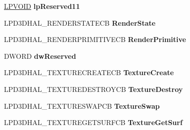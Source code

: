\begin{DoxyCompactItemize}
\mbox{\label{struct___d3_d_h_a_l___c_a_l_l_b_a_c_k_s_ae641db5139f703c8121cf2cdafe77bea}} 
\hyperlink{interfacevoid}{L\+P\+V\+O\+ID} {\bfseries lp\+Reserved11}
\item 
\mbox{\label{struct___d3_d_h_a_l___c_a_l_l_b_a_c_k_s_a1f3d6ab6e90412c0942079c0cc2cc297}} 
L\+P\+D3\+D\+H\+A\+L\+\_\+\+R\+E\+N\+D\+E\+R\+S\+T\+A\+T\+E\+CB {\bfseries Render\+State}
\item 
\mbox{\label{struct___d3_d_h_a_l___c_a_l_l_b_a_c_k_s_a1d99b52b0e480cd1afcd4b77173895ca}} 
L\+P\+D3\+D\+H\+A\+L\+\_\+\+R\+E\+N\+D\+E\+R\+P\+R\+I\+M\+I\+T\+I\+V\+E\+CB {\bfseries Render\+Primitive}
\item 
\mbox{\label{struct___d3_d_h_a_l___c_a_l_l_b_a_c_k_s_ac62b7b42341c7be361a82766ef412054}} 
D\+W\+O\+RD {\bfseries dw\+Reserved}
\item 
\mbox{\label{struct___d3_d_h_a_l___c_a_l_l_b_a_c_k_s_af08d0797cb0e285fb07c2abb7fdbc12d}} 
L\+P\+D3\+D\+H\+A\+L\+\_\+\+T\+E\+X\+T\+U\+R\+E\+C\+R\+E\+A\+T\+E\+CB {\bfseries Texture\+Create}
\item 
\mbox{\label{struct___d3_d_h_a_l___c_a_l_l_b_a_c_k_s_af7dccd66865eab6f9fb19172624d206d}} 
L\+P\+D3\+D\+H\+A\+L\+\_\+\+T\+E\+X\+T\+U\+R\+E\+D\+E\+S\+T\+R\+O\+Y\+CB {\bfseries Texture\+Destroy}
\item 
\mbox{\label{struct___d3_d_h_a_l___c_a_l_l_b_a_c_k_s_ac5a7ea06127d3d693a1d3b035984968f}} 
L\+P\+D3\+D\+H\+A\+L\+\_\+\+T\+E\+X\+T\+U\+R\+E\+S\+W\+A\+P\+CB {\bfseries Texture\+Swap}
\item 
\mbox{\label{struct___d3_d_h_a_l___c_a_l_l_b_a_c_k_s_a35ab0d53e09c2652f9cfc0f845b673f0}} 
L\+P\+D3\+D\+H\+A\+L\+\_\+\+T\+E\+X\+T\+U\+R\+E\+G\+E\+T\+S\+U\+R\+F\+CB {\bfseries Texture\+Get\+Surf}
\item 
\mbox{\label{struct___d3_d_h_a_l___c_a_l_l_b_a_c_k_s_a08a4481d6a8e59535b8e8018ce64728c}} 

\end{DoxyCompactItemize}
